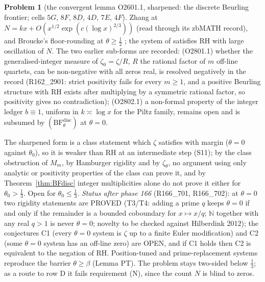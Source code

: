 \documentclass[11pt]{amsart}
\theoremstyle{definition}
\newtheorem{problem}{Problem}
\theoremstyle{remark}
\newcommand{\N}{\mathbb N}
\begin{document}
\begin{problem}[the convergent lemma O2601.1, sharpened: the discrete Beurling frontier; cells $5G$, $8F$, $8D$, $4D$, $7E$, $4F$]
Zhang at $N=kx+O(x^{1/2}\exp(c(\log x)^{2/3}))$ \cite{Zhang2007} (read through its zbMATH record), and Broucke's
floor-rounding at $\theta\ge\frac12$ \cite[Thm.~6.3]{Broucke2024}; the system of \cite{BDV2020} satisfies RH with
large oscillation of $N$. The two earlier sub-forms are recorded: (O2801.1) whether the generalised-integer measure of
$\zeta_0=\zeta/R$, $R$ the rational factor of $m$ off-line quartets, can be non-negative with all zeros real, is
resolved negatively in the record (R162\_2901: strict positivity fails for every $m\ge1$, and a positive Beurling
structure with RH exists after multiplying by a symmetric rational factor, so positivity gives no contradiction);
(O2802.1) a non-formal property of the integer ledger $b\equiv1$, uniform in $k\asymp\log x$ for the Piltz family,
remains open and is subsumed by $(\mathrm{BF}^{\mathrm{disc}}_\theta)$ at $\theta=0$.
\end{problem}
\noindent The sharpened form is a class statement which $\zeta$ satisfies with margin ($\theta=0$ against
$\theta_0$), so it is weaker than RH at an intermediate step (S11); by the class obstruction of $M_m$, by
Hamburger rigidity and by $\zeta_\theta$, no argument using only analytic or positivity properties of the class can
prove it, and by Theorem~\ref{thm:BFdisc} integer multiplicities alone do not prove it either for $\theta_0>\frac13$. Open for $\theta_0\le\frac13$.
\emph{Status after phase 166} (R166\_701, R166\_702): at $\theta=0$ two rigidity statements are PROVED (T3/T4: adding a prime $q$ keeps
$\theta=0$ if and only if the remainder is a bounded coboundary for $x\mapsto x/q$; $\N$ together with any real $q>1$ is never $\theta=0$;
novelty to be checked against Hilberdink 2012); the conjectures C1 (every $\theta=0$ system is $\zeta$ up to a finite Euler modification) and C2
(some $\theta=0$ system has an off-line zero) are OPEN, and if C1 holds then C2 is equivalent to the negation of RH. Position-tuned and
prime-replacement systems reproduce the barrier $\theta\ge\beta$ (Lemma PT). The problem stays two-sided below $\frac13$; as a route to
row D it fails requirement (N), since the count $N$ is blind to zeros.
\end{document}
